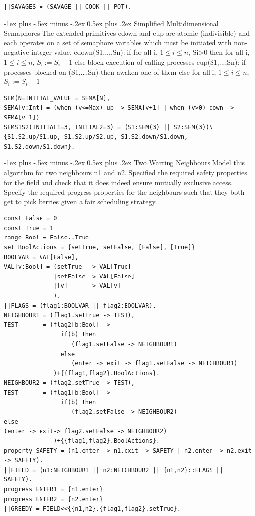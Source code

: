 \documentclass[letterpaper, 8pt]{extarticle}
\makeatletter
\renewcommand{\section}{\@startsection{section}{1}{0mm}%
                                {-1ex plus -.5ex minus -.2ex}%
                                {0.5ex plus .2ex}%
                                {\normalfont\normalsize\bfseries}}
\makeatother
\begin{document}
\begin{multicols*}{5}
\begin{lstlisting}
||SAVAGES = (SAVAGE || COOK || POT).
\end{lstlisting}

  \section{Simplified Multidimensional Semaphores}
  The extended primitives edown and eup are atomic (indivisible) and each operates on a set of semaphore variables which must be initiated with non-negative integer value. edown(S1,...,Sn): if for all i, $1\leq i\leq n$, Si>0 then for all i, $1\leq i\leq n$, $S_i := S_i -1$ else block execution of calling processes eup(S1,...,Sn): if processes blocked on (S1,...,Sn) then awaken one of them else for all i, $1\leq i\leq n$, $S_i := S_i +1$
  \begin{lstlisting}
SEM(N=INITIAL_VALUE = SEMA[N],
SEMA[v:Int] = (when (v<=Max) up -> SEMA[v+1] | when (v>0) down -> SEMA[v-1]).
SEMS1S2(INITIAL1=3, INITIAL2=3) = (S1:SEM(3) || S2:SEM(3))\{S1.S2.up/S1.up, S1.S2.up/S2.up, S1.S2.down/S1.down, S1.S2.down/S1.down}.
\end{lstlisting} %

  \section{Two Warring Neighbours}
  Model this algorithm for two neighbours n1 and n2. Specified the required safety properties for the field and check that it does indeed ensure mutually exclusive access. Specify the required progress properties for the neighbours such that they both get to pick berries given a fair scheduling strategy.
  \begin{lstlisting}
const False = 0
const True = 1
range Bool = False..True
set BoolActions = {setTrue, setFalse, [False], [True]}
BOOLVAR = VAL[False],
VAL[v:Bool] = (setTrue  -> VAL[True]
              |setFalse -> VAL[False]
              |[v]      -> VAL[v]
              ).
||FLAGS = (flag1:BOOLVAR || flag2:BOOLVAR).
NEIGHBOUR1 = (flag1.setTrue -> TEST),
TEST       = (flag2[b:Bool] ->
                if(b) then
                   (flag1.setFalse -> NEIGHBOUR1)
                else
                   (enter -> exit -> flag1.setFalse -> NEIGHBOUR1)
              )+{{flag1,flag2}.BoolActions}.
NEIGHBOUR2 = (flag2.setTrue -> TEST),
TEST       = (flag1[b:Bool] ->
                if(b) then
                   (flag2.setFalse -> NEIGHBOUR2)
else
(enter -> exit-> flag2.setFalse -> NEIGHBOUR2)
              )+{{flag1,flag2}.BoolActions}.
property SAFETY = (n1.enter -> n1.exit -> SAFETY | n2.enter -> n2.exit -> SAFETY).
||FIELD = (n1:NEIGHBOUR1 || n2:NEIGHBOUR2 || {n1,n2}::FLAGS || SAFETY).
progress ENTER1 = {n1.enter} 
progress ENTER2 = {n2.enter}
||GREEDY = FIELD<<{{n1,n2}.{flag1,flag2}.setTrue}.
\end{lstlisting}


\end{multicols*}
\end{document}
